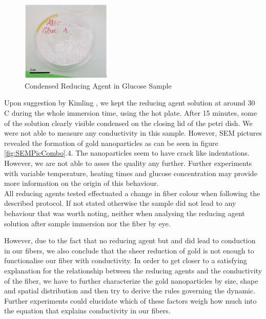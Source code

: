 \begin{figure}
	\begin{center}
		\includegraphics[width=0.38\textwidth]{./pic/Gluc.PNG}
	\end{center}
	\caption{\label{Gluc} Condensed Reducing Agent in Glucose Sample}	
\end{figure}
Upon suggestion by Kimling \cite{Kimling}, we kept the reducing agent solution at around 30 \degree C during the whole immersion time, using the hot plate. After 15 minutes, some of the solution clearly 
 visible condensed on the closing lid of the petri dish. We were not able to measure any conductivity in this sample.
However, SEM pictures revealed the formation of gold nanoparticles as can be seen in figure \ref{fig:SEMPicCombo}.4. The nanoparticles seem to have crack like indentations. However, we are not able to asses the quality any further. Further experiments with variable temperature, heating times and glucose concentration may provide more information on the origin of this behaviour.\\
All reducing agents tested effectuated a change in fiber colour when following the described protocol. If not stated otherwise the sample did not lead to any behaviour that was worth noting, neither when analysing the reducing agent solution after sample immersion nor the fiber by eye.

However, due to the fact that no reducing agent but  and  did lead to conduction in our fibers, we also conclude that the sheer reduction of gold is not enough to functionalise our fiber with conductivity. In order to get closer to a satisfying explanation for the relationship between the reducing agents and the conductivity of the fiber, we have to further characterize the gold nanoparticles by size, shape and spatial distribution and then try to derive the rules governing the dynamic. Further experiments could elucidate which of these factors weigh how much into the equation that explains conductivity in our fibers. 



